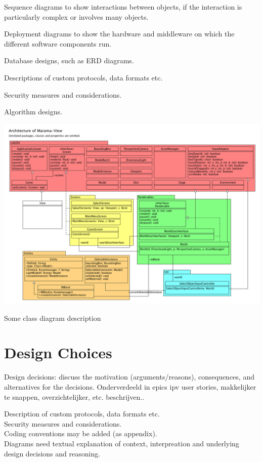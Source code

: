 \documentclass[10pt]{extarticle} %
\begin{document}
    Sequence diagrams to show interactions between objects, if the interaction is particularly complex or involves many objects.

    Deployment diagrams to show the hardware and middleware on which the different software components run.

    Database designs, such as ERD diagrams.

    Descriptions of custom protocols, data formats etc.

    Security measures and considerations.

    Algorithm designs.

    \includegraphics[width=1\linewidth]{architecture-marama-view.png}

    Some class diagram description

    \newpage

    \section{Design Choices}
    Design decisions: discuss the motivation (arguments/reasons), consequences,
    and alternatives for the decisions.
    Onderverdeeld in epics ipv user stories, makkelijker te snappen, overzichtelijker, etc. beschrijven..

    Description of custom protocols, data formats etc.\\
    Security measures and considerations.\\
    Coding conventions may be added (as appendix).\\
    Diagrams need textual explanation of context, interpreation and underlying design decisions and reasoning.\\
\end{document}
